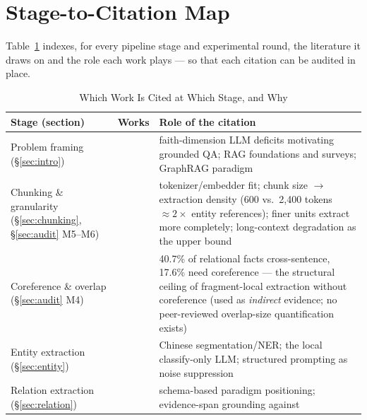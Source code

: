 
\appendices

\section{Stage-to-Citation Map}
\label{app:citations}

Table~\ref{tab:citemap} indexes, for every pipeline stage and
experimental round, the literature it draws on and the role each work
plays --- so that each citation can be audited in place.

\begin{table}[!t]
\caption{Which Work Is Cited at Which Stage, and Why}
\label{tab:citemap}
\centering
\begin{threeparttable}
\begin{tabular}{@{}p{3.5cm}p{4.1cm}p{9.2cm}@{}}
\toprule
Stage (section) & Works & Role of the citation \\
\midrule
Problem framing (\S\ref{sec:intro}) &
\cite{hilliard2025flourishing,lewis2020rag,gao2023ragsurvey,edge2024graphrag,peng2026graphragsurvey} &
faith-dimension LLM deficits motivating grounded QA; RAG foundations and
surveys; GraphRAG paradigm \\
\addlinespace
Chunking \& granularity (\S\ref{sec:chunking}, \S\ref{sec:audit} M5--M6) &
\cite{chen2024bgem3,edge2024graphrag,lairgi2025atom,liu2024lost} &
tokenizer/embedder fit; chunk size $\to$ extraction density (600 vs.\
2{,}400 tokens $\approx 2\times$ entity references); finer units extract
more completely; long-context degradation as the upper bound \\
\addlinespace
Coreference \& overlap (\S\ref{sec:audit} M4) &
\cite{yao2019docred} &
40.7\% of relational facts cross-sentence, 17.6\% need coreference ---
the structural ceiling of fragment-local extraction without coreference
(used as \emph{indirect} evidence; no peer-reviewed overlap-size
quantification exists) \\
\addlinespace
Entity extraction (\S\ref{sec:entity}) &
\cite{ckip,gemmateam2025gemma3,meher2025corekg,meher2025insidecorekg} &
Chinese segmentation/NER; the local classify-only LLM; structured
prompting as noise suppression \\
\addlinespace
Relation extraction (\S\ref{sec:relation}) &
\cite{bian2025kgsurvey,huang2025tcrqf} &
schema-based paradigm positioning; evidence-span grounding against

\end{tabular}
\end{threeparttable}
\end{table}
